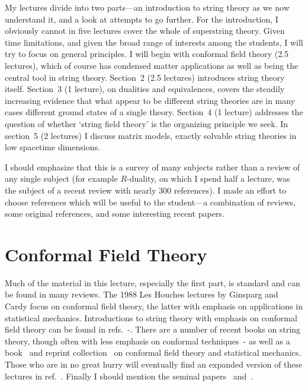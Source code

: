 My lectures divide into two parts---an introduction to
string theory as we now understand it, and a look at attempts to go
further.  For the introduction, I obviously cannot in five
lectures cover the whole of superstring theory.  Given time
limitations, and given the broad range of interests among the
students, I will try to focus on general
principles.  I will begin with conformal field theory (2.5
lectures), which of course has condensed matter applications as well
as being the central tool in string theory.
Section~2 (2.5 lectures)
introduces string theory itself.  Section~3 (1 lecture), on dualities
and equivalences, covers the steadily increasing evidence that what
appear to be different string theories are in many cases different
ground states of a single theory.  Section~4 (1 lecture) addresses the
question of whether `string field theory' is the organizing principle
we seek.  In section~5 (2 lectures) I discuss matrix models, exactly
solvable string theories in low spacetime dimensions.

I should emphasize that this is a survey of many subjects rather
than a review of any single subject (for example $R$-duality, on
which I spend half a lecture, was the subject of a recent
review \cite{GPR} with nearly 300 references).  
I made an effort to choose references which will be useful to the
student---a combination
of reviews, some original references, and some interesting recent
papers.

\section{Conformal Field Theory}
\setcounter{footnote}{0}

Much of the material in this lecture, especially the first part,
is standard and can be found in many reviews.  The 1988 Les Houches
lectures by Ginsparg \cite{G_LH} and Cardy \cite{C_LH} focus on
conformal field theory, the latter with emphasis on applications in
statistical mechanics.  Introductions to string theory with
emphasis on conformal field theory can be found in
refs.~\cite{F_LH}-\cite{D'H_TASI}.  There are a number of
recent books on string theory, though often with less emphasis on
conformal techniques~\cite{GSW}-\cite{Hat}
as well as a book~\cite{DI} and reprint collection~\cite{ISZ} 
on conformal field theory and statistical mechanics.
Those who are in no
great hurry will eventually find an expanded version of these
lectures in ref.~\cite{JBBS}.  Finally I should mention the seminal
papers~\cite{BPZ} and~\cite{FMS}.

